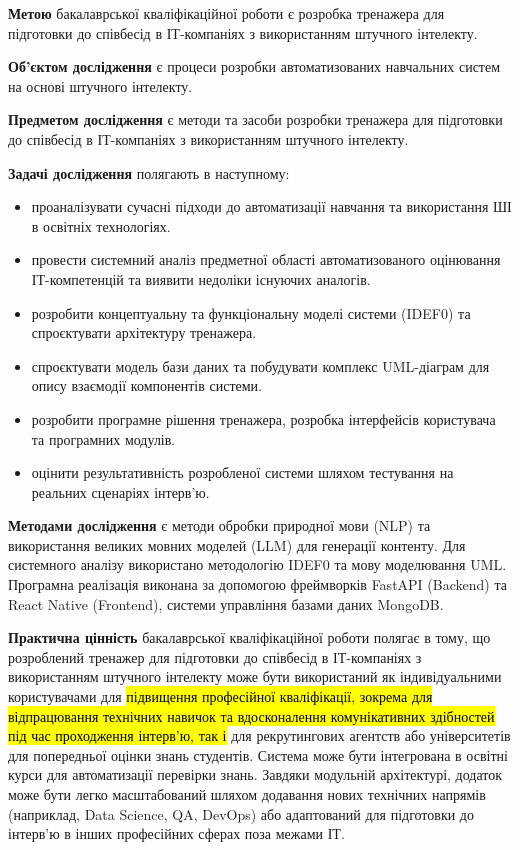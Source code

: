\textbf{Метою} бакалаврської кваліфікаційної роботи є розробка тренажера
для підготовки до співбесід в ІТ-компаніях з використанням штучного
інтелекту.

\textbf{Об'єктом дослідження} є процеси розробки автоматизованих
навчальних систем на основі штучного інтелекту.

\textbf{Предметом дослідження} є методи та засоби розробки тренажера для
підготовки до співбесід в ІТ-компаніях з використанням штучного
інтелекту.

\textbf{Задачі дослідження} полягають в наступному:

\begin{itemize}
\item
  проаналізувати сучасні підходи до автоматизації навчання та
  використання ШІ в освітніх технологіях.
\item
  провести системний аналіз предметної області автоматизованого
  оцінювання ІТ-компетенцій та виявити недоліки існуючих аналогів.
\item
  розробити концептуальну та функціональну моделі системи (IDEF0) та
  спроєктувати архітектуру тренажера.
\item
  спроєктувати модель бази даних та побудувати комплекс UML-діаграм для
  опису взаємодії компонентів системи.
\item
  розробити програмне рішення тренажера, розробка інтерфейсів
  користувача та програмних модулів.
\item
  оцінити результативність розробленої системи шляхом тестування на
  реальних сценаріях інтерв'ю.
\end{itemize}

\textbf{Методами дослідження} є методи обробки природної мови (NLP) та
використання великих мовних моделей (LLM) для генерації контенту. Для
системного аналізу використано методологію IDEF0 та мову моделювання
UML. Програмна реалізація виконана за допомогою фреймворків FastAPI
(Backend) та React Native (Frontend), системи управління базами даних
MongoDB.

\textbf{Практична цінність} бакалаврської кваліфікаційної роботи полягає
в тому, що розроблений тренажер для підготовки до співбесід в
ІТ-компаніях з використанням штучного інтелекту може бути використаний
як індивідуальними користувачами для \hl{підвищення професійної
кваліфікації, зокрема для відпрацювання технічних навичок та
вдосконалення комунікативних здібностей під час проходження інтерв'ю,
так і} для рекрутингових агентств або університетів для попередньої
оцінки знань студентів. Система може бути інтегрована в освітні курси
для автоматизації перевірки знань. Завдяки модульній архітектурі,
додаток може бути легко масштабований шляхом додавання нових технічних
напрямів (наприклад, Data Science, QA, DevOps) або адаптований для
підготовки до інтерв'ю в інших професійних сферах поза межами ІТ.

